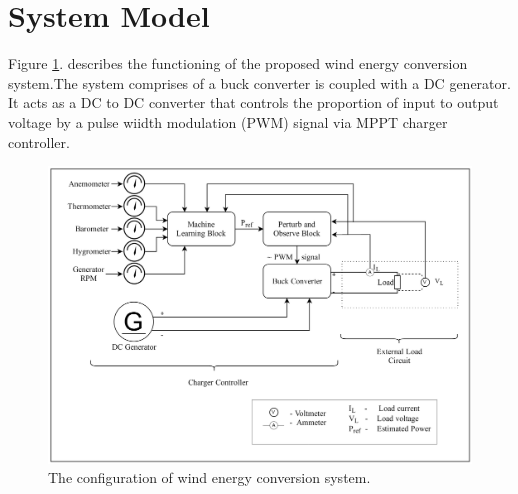 \section{System Model}
\label{sec:1}
Figure \ref{Figure:2}. describes the functioning of the proposed wind energy conversion system.The system comprises of a buck converter is coupled with a DC generator. It acts as a DC to DC converter that controls the proportion of input to output voltage by a pulse wiidth modulation (PWM) signal via MPPT charger controller.
\begin{center}
\begin{figure}
 \includegraphics[width=12cm,keepaspectratio]{2.png}
\caption{The configuration of wind energy conversion system.}
\label{Figure:2}    
\end{figure}
\end{center}
